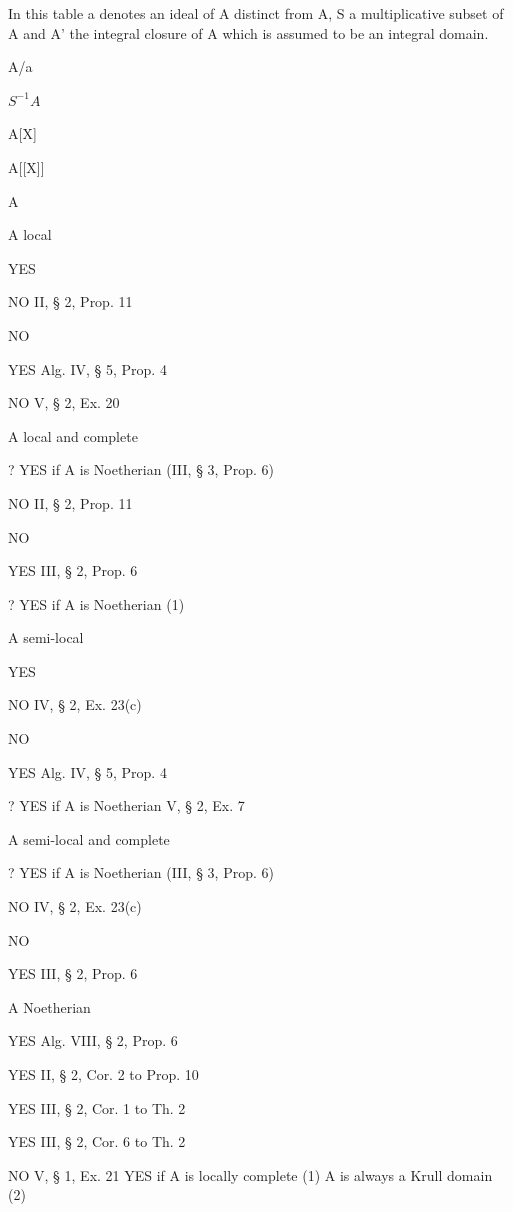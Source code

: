 
In this table a denotes an ideal of A distinct from A, S a multiplicative subset of A and A' the integral closure of A which is assumed to be an integral domain.

A/a

\(S^{-1}A\)

A{[}X{]}

A{[}{[}X{]}{]}

A\textquotesingle{}

A local

YES

NO II, § 2, Prop. 11

NO

YES Alg. IV, § 5, Prop. 4

NO V, § 2, Ex. 20

A local and complete

? YES if A is Noetherian (III, § 3, Prop. 6)

NO II, § 2, Prop. 11

NO

YES III, § 2, Prop. 6

? YES if A is Noetherian (1)

A semi-local

YES

NO IV, § 2, Ex. 23(c)

NO

YES Alg. IV, § 5, Prop. 4

? YES if A is Noetherian V, § 2, Ex. 7

A semi-local and complete

? YES if A is Noetherian (III, § 3, Prop. 6)

NO IV, § 2, Ex. 23(c)

NO

YES III, § 2, Prop. 6

A Noetherian

YES Alg. VIII, § 2, Prop. 6

YES II, § 2, Cor. 2 to Prop. 10

YES III, § 2, Cor. 1 to Th. 2

YES III, § 2, Cor. 6 to Th. 2

NO V, § 1, Ex. 21 YES if A is locally complete (1) A\textquotesingle{} is always a Krull domain (2)

